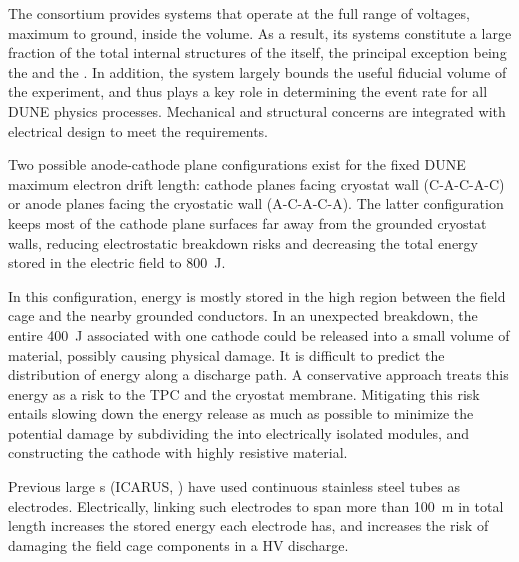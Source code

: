 The  consortium provides systems that operate at the full range of voltages, %
maximum to ground, inside the  volume. As a result, its systems constitute a large fraction of the total internal structures of the  itself, the principal exception being the  and the . In addition, the  system largely bounds the useful fiducial volume of the experiment, and thus plays a key role in determining the event rate for all DUNE physics processes. Mechanical and structural concerns are integrated with electrical design to meet the requirements. 


Two possible anode-cathode plane configurations exist for the fixed DUNE maximum electron drift length: cathode planes facing cryostat wall (C-A-C-A-C) or anode planes facing the cryostatic wall (A-C-A-C-A).  The latter configuration keeps most of the cathode plane surfaces far away from the grounded cryostat walls, reducing electrostatic breakdown risks and decreasing the total energy stored in the electric field to \SI{800}{J}.

In this configuration, energy is mostly stored in the high \efield{} region between the field cage and the nearby grounded conductors.  In an unexpected  breakdown, the entire \SI{400}{J} associated with one cathode could be released into a small volume of material, possibly causing physical damage.
It is difficult to predict the distribution of energy along a discharge path. A conservative approach treats this energy as a risk to the TPC and the cryostat membrane.  
Mitigating this risk entails slowing down the energy release as much as possible to minimize the potential damage by subdividing the  into electrically isolated modules, and constructing the cathode with highly resistive material.

Previous large \lartpc{}s (ICARUS, \microboone) have used continuous stainless steel tubes as electrodes. 
Electrically, linking such electrodes to span more than \SI{100}{\m} in total length increases the stored energy each electrode has, and increases the risk of damaging the field cage components in a HV discharge. 

